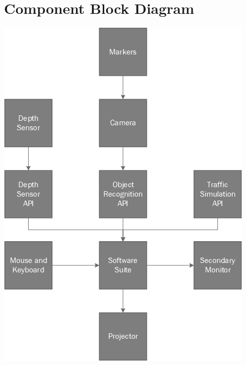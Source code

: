 \documentclass[letterpaper, 10pt, onecolumn, draftclsnofoot]{IEEEtran}
\begin{document}
    \section{Component Block Diagram}
    \label{ComponentBlockDiagram}
        \begin{center}
        \includegraphics{BlockDiagram.png}
        \end{center}
\end{document}
